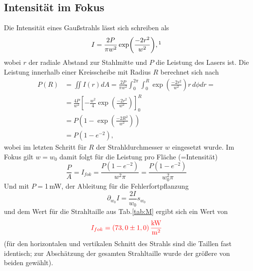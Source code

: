 \subsection{Intensität im Fokus}
Die Intensität eines Gaußstrahls lässt sich schreiben als 
\begin{equation*}
    I = \frac{2P}{\pi w^2} \exp(\frac{-2r^2}{w^2}), \mathrm{\footnotemark}
\end{equation*}
wobei $r$ der radiale Abstand zur Stahlmitte und $P$ die Leistung des Lasers ist. Die Leistung innerhalb einer Kreisscheibe mit Radius $R$ berechnet sich nach 
\begin{align*}
    P(R) &= \iint I(r) dA = \frac{2P}{\pi w^2} \int_0^{2\pi} \int_0^R \exp(\frac{-2r^2}{w^2})r\, d\phi dr = \\
    &= \frac{4P}{w^2} [-\frac{w^2}{4}\exp(\frac{-2r^2}{w^2})]_0^R \\
    &= P (1-\exp(\frac{-2R^2}{w^2}))\\
    &= P(1-e^{-2}),
\end{align*}
wobei im letzten Schritt für $R$ der Strahldurchmesser $w$ eingesetzt wurde. Im Fokus gilt $w = w_0$ damit folgt für die Leistung pro Fläche (=Intensität)
\begin{equation*}
    \frac{P}{A} = I_{fok} = \frac{P(1-e^{-2})}{w^2\pi} = \frac{P(1-e^{-2})}{w_0^2\pi}
\end{equation*}
Und mit $P =$1\,mW, der Ableitung für die Fehlerfortpflanzung 
\begin{equation*}
    \partial_{w_0}I = \frac{2I}{w_0}s_{w_0}
\end{equation*}
und dem Wert für die Strahltaille aus Tab.\ref{tab:M} ergibt sich ein Wert von 
\begin{equation*}
    \textcolor{red}{I_{fok} = (73,0 \pm 1,0)\,\frac{\mathrm{kW}}{\mathrm{m^2}}}
\end{equation*}
(für den horizontalen und vertikalen Schnitt des Strahls sind die Taillen fast identisch; zur Abschätzung der gesamten 
Strahltaille wurde der größere von beiden gewählt).
